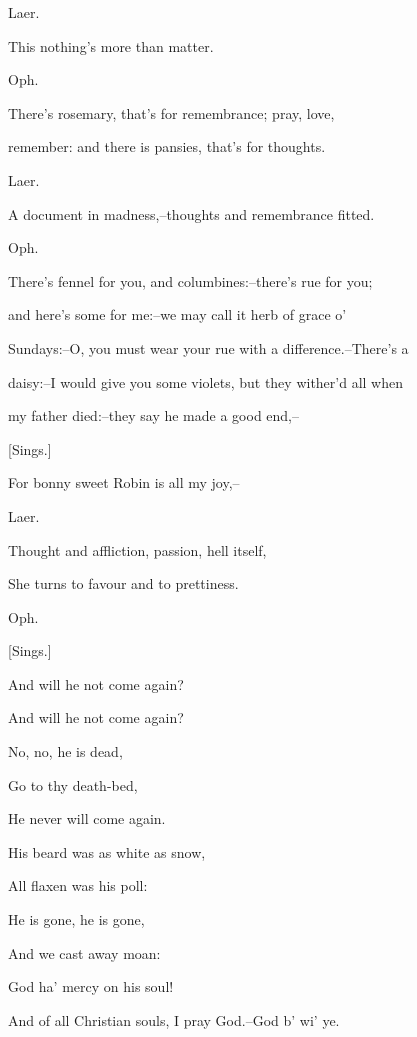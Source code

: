 \documentclass[12pt]{book}
\begin{document}
Laer.

This nothing's more than matter.



Oph.

There's rosemary, that's for remembrance; pray, love,

remember: and there is pansies, that's for thoughts.



Laer.

A document in madness,--thoughts and remembrance fitted.



Oph.

There's fennel for you, and columbines:--there's rue for you;

and here's some for me:--we may call it herb of grace o'

Sundays:--O, you must wear your rue with a difference.--There's a

daisy:--I would give you some violets, but they wither'd all when

my father died:--they say he made a good end,--

[Sings.]

   For bonny sweet Robin is all my joy,--



Laer.

Thought and affliction, passion, hell itself,

She turns to favour and to prettiness.



Oph.

[Sings.]

   And will he not come again?

   And will he not come again?

     No, no, he is dead,

     Go to thy death-bed,

   He never will come again.



   His beard was as white as snow,

   All flaxen was his poll:

     He is gone, he is gone,

     And we cast away moan:

   God ha' mercy on his soul!



And of all Christian souls, I pray God.--God b' wi' ye.
\end{document}
